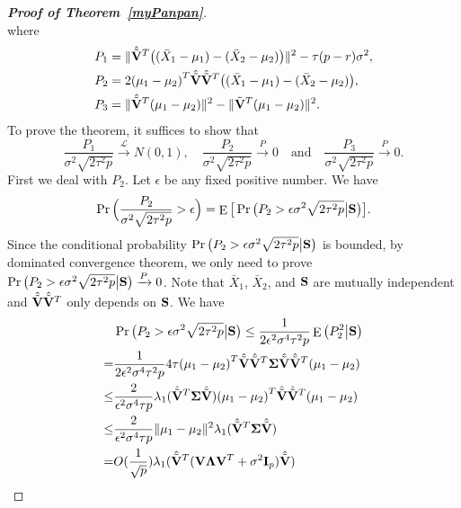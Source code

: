\documentclass[review]{elsarticle}
\DeclareMathOperator{\myE}{E}
\theoremstyle{plain}
\theoremstyle{definition}
\theoremstyle{remark}
\begin{document}
\begin{appendices}
\begin{proof}[\textbf{Proof of Theorem~\ref{myPanpan}}]
\begin{equation*}
\end{equation*}
where
\begin{align*}
    P_1&=\|\hat{\tilde{\mathbf{V}}}^T\big((\bar{X}_1-\mu_1)-(\bar{X}_2-\mu_2)\big)\|^2- \tau (p-r)\sigma^2,\\
    P_2&=2{(\mu_1-\mu_2)}^T \hat{\tilde{\mathbf{V}}}\hat{\tilde{\mathbf{V}}}^T\big((\bar{X}_1-\mu_1)-(\bar{X}_2-\mu_2)\big),\\
    P_3&=\|\hat{\tilde{\mathbf{V}}}^T(\mu_1-\mu_2)\|^2-\|\tilde{\mathbf{V}}^T(\mu_1-\mu_2)\|^2.
\end{align*}
To prove the theorem, it suffices to show that
$$
    \frac{P_1}{\sigma^2\sqrt{2\tau^2 p}}\xrightarrow{\mathcal{L}} N(0,1),
    \quad
    \frac{P_2}{\sigma^2\sqrt{2\tau^2 p}}\xrightarrow{P} 0
    \quad
    \textrm{and}
    \quad
    \frac{P_3}{\sigma^2\sqrt{2\tau^2 p}}\xrightarrow{P}0.
    $$
   First we deal with $P_2$.
   Let $\epsilon$ be any fixed positive number. 
   We have
   $$
   \Pr\Big(\frac{P_2}{\sigma^2\sqrt{2\tau^2 p}}>\epsilon\Big)
   =
   \myE\big[\Pr\big({P_2}>\epsilon{\sigma^2\sqrt{2\tau^2 p}}\big|\BS\big)\big].
   $$
   Since the conditional probability 
   $
   \Pr\big({P_2}>\epsilon{\sigma^2\sqrt{2\tau^2 p}}\big|\mathbf{S}\big)
   $
   is bounded, by dominated convergence theorem, we only need to prove
   $\Pr\big({P_2}>\epsilon{\sigma^2\sqrt{2\tau^2 p}}\big|\mathbf{S}\big)\xrightarrow{P}0$.
    Note that $\bar{X}_1$, $\bar{X}_2$, and $\mathbf{S}$ are mutually independent and $\hat{\tilde{\mathbf{V}}}\hat{\tilde{\mathbf{V}}}^T$ only depends on $\mathbf{S}$.
    We have
    \begin{equation*}
        \begin{aligned}
            &\Pr\big({P_2}>\epsilon{\sigma^2\sqrt{2\tau^2 p}}\big|\BS\big)\leq
            \frac{1}{2\epsilon^2\sigma^4\tau^2 p}\myE \big(P_2^2\big|\BS\big)\\
            =&\frac{1}{2\epsilon^2\sigma^4\tau^2 p} 4\tau {(\mu_1-\mu_2)}^T \hat{\tilde{\BV}}\hat{\tilde{\BV}}^T\bSigma \hat{\tilde{\BV}}\hat{\tilde{\BV}}^T(\mu_1-\mu_2)\\
            \leq &
            \frac{2}{\epsilon^2\sigma^4\tau p}
             \lambda_1(\hat{\tilde{\BV}}^T\bSigma \hat{\tilde{\BV}}) {(\mu_1-\mu_2)}^T \hat{\tilde{\BV}}\hat{\tilde{\BV}}^T(\mu_1-\mu_2)\\
            \leq & 
\frac{2}{\epsilon^2\sigma^4\tau p}
             \|\mu_1-\mu_2\|^2
             \lambda_1(\hat{\tilde{\BV}}^T\bSigma \hat{\tilde{\BV}})\\
             =&
             O(\frac{1}{\sqrt{p}})
             \lambda_1(\hat{\tilde{\BV}}^T (\BV\bLambda \BV^T +\sigma^2 \BI_p) \hat{\tilde{\BV}})\\

\end{aligned}
\end{equation*}
\end{proof}
\end{appendices}
\end{document}
